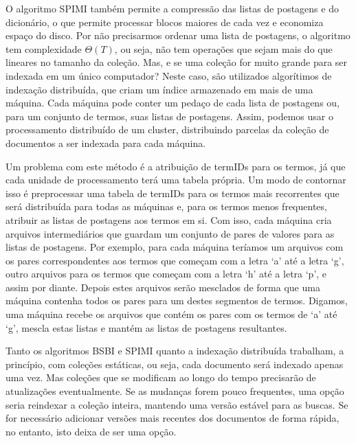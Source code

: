 O algoritmo SPIMI também permite a compressão das listas de postagens e do dicionário, o que permite processar blocos maiores de cada vez e economiza espaço do disco. Por não precisarmos ordenar uma lista de postagens, o algoritmo tem complexidade $\Theta( T )$, ou seja, não tem operações que sejam mais do que lineares no tamanho da coleção.
Mas, e se uma coleção for muito grande para ser indexada em um único computador? Neste caso, são utilizados algorítimos de indexação distribuída, que criam um índice armazenado em mais de uma máquina. Cada máquina pode conter um pedaço de cada lista de postagens ou, para um conjunto de termos, suas listas de postagens. Assim, podemos usar o processamento distribuído de um cluster, distribuindo parcelas da coleção de documentos a ser indexada para cada máquina.

Um problema com este método é a atribuição de termIDs para os termos, já que cada unidade de processamento terá uma tabela própria. Um modo de contornar isso é preprocessar uma tabela de termIDs para os termos mais recorrentes que será distribuída para todas as máquinas e, para os termos menos frequentes, atribuir as listas de postagens aos termos em si. Com isso, cada máquina cria arquivos intermediários que guardam um conjunto de pares de valores para as listas de postagens. Por exemplo, para cada máquina teríamos um arquivos com os pares correspondentes aos termos que começam com a letra ‘a’ até a letra ‘g’, outro arquivos para os termos que começam com a letra ‘h’ até a letra ‘p’, e assim por diante. Depois estes arquivos serão mesclados de forma que uma máquina contenha todos os pares para um destes segmentos de termos. Digamos, uma máquina recebe os arquivos que contém os pares com os termos de ‘a’ até ‘g’, mescla estas listas e mantém as listas de postagens resultantes.

Tanto os algoritmos BSBI e SPIMI quanto a indexação distribuída trabalham, a princípio, com coleções estáticas, ou seja, cada documento será indexado apenas uma vez. Mas coleções que se modificam ao longo do tempo precisarão de atualizações eventualmente. Se as mudanças forem pouco frequentes, uma opção seria reindexar a coleção inteira, mantendo uma versão estável para as buscas. Se for necessário adicionar versões mais recentes dos documentos de forma rápida, no entanto, isto deixa de ser uma opção. 

